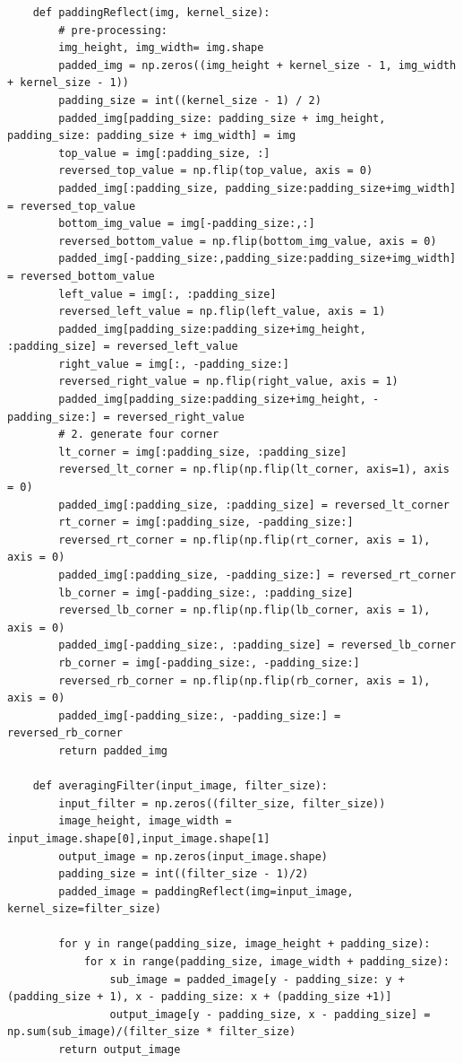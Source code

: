 \documentclass[12pt]{article}
\begin{document}
\begin{enumerate}[leftmargin=\labelsep]
\begin{enumerate}
\begin{lstlisting}
    def paddingReflect(img, kernel_size):
        # pre-processing:
        img_height, img_width= img.shape
        padded_img = np.zeros((img_height + kernel_size - 1, img_width + kernel_size - 1))
        padding_size = int((kernel_size - 1) / 2)
        padded_img[padding_size: padding_size + img_height, padding_size: padding_size + img_width] = img
        top_value = img[:padding_size, :]
        reversed_top_value = np.flip(top_value, axis = 0)
        padded_img[:padding_size, padding_size:padding_size+img_width] = reversed_top_value
        bottom_img_value = img[-padding_size:,:]
        reversed_bottom_value = np.flip(bottom_img_value, axis = 0)
        padded_img[-padding_size:,padding_size:padding_size+img_width] = reversed_bottom_value
        left_value = img[:, :padding_size]
        reversed_left_value = np.flip(left_value, axis = 1)
        padded_img[padding_size:padding_size+img_height, :padding_size] = reversed_left_value
        right_value = img[:, -padding_size:]
        reversed_right_value = np.flip(right_value, axis = 1)
        padded_img[padding_size:padding_size+img_height, -padding_size:] = reversed_right_value
        # 2. generate four corner
        lt_corner = img[:padding_size, :padding_size]
        reversed_lt_corner = np.flip(np.flip(lt_corner, axis=1), axis = 0)
        padded_img[:padding_size, :padding_size] = reversed_lt_corner
        rt_corner = img[:padding_size, -padding_size:]
        reversed_rt_corner = np.flip(np.flip(rt_corner, axis = 1), axis = 0)
        padded_img[:padding_size, -padding_size:] = reversed_rt_corner
        lb_corner = img[-padding_size:, :padding_size]
        reversed_lb_corner = np.flip(np.flip(lb_corner, axis = 1), axis = 0)
        padded_img[-padding_size:, :padding_size] = reversed_lb_corner
        rb_corner = img[-padding_size:, -padding_size:]
        reversed_rb_corner = np.flip(np.flip(rb_corner, axis = 1), axis = 0)
        padded_img[-padding_size:, -padding_size:] = reversed_rb_corner
        return padded_img

    def averagingFilter(input_image, filter_size):
        input_filter = np.zeros((filter_size, filter_size))
        image_height, image_width = input_image.shape[0],input_image.shape[1]
        output_image = np.zeros(input_image.shape)
        padding_size = int((filter_size - 1)/2)
        padded_image = paddingReflect(img=input_image, kernel_size=filter_size)

        for y in range(padding_size, image_height + padding_size):
            for x in range(padding_size, image_width + padding_size):
                sub_image = padded_image[y - padding_size: y + (padding_size + 1), x - padding_size: x + (padding_size +1)]
                output_image[y - padding_size, x - padding_size] = np.sum(sub_image)/(filter_size * filter_size)
        return output_image  


\end{lstlisting}
\end{enumerate}
\end{enumerate}
\end{document}
